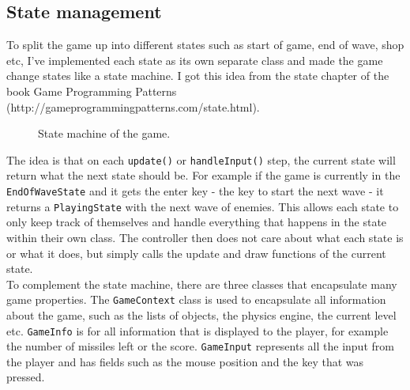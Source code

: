 \documentclass{article}
\newcommand{\n}[0]{\\[\baselineskip]}
\begin{document}
\subsection{State management}
To split the game up into different states such as start of game, end of wave, shop etc, I've implemented each state as its own separate class and made the game change states like a state machine. I got this idea from the state chapter of the book Game Programming Patterns (http://gameprogrammingpatterns.com/state.html).
\begin{figure}[H]
\caption{State machine of the game.}
\end{figure}
\noindent
The idea is that on each \texttt{update()} or \texttt{handleInput()} step, the current state will return what the next state should be. For example if the game is currently in the \texttt{EndOfWaveState} and it gets the enter key - the key to start the next wave - it returns a \texttt{PlayingState} with the next wave of enemies. This allows each state to only keep track of themselves and handle everything that happens in the state within their own class. The controller then does not care about what each state is or what it does, but simply calls the update and draw functions of the current state.
\n
To complement the state machine, there are three classes that encapsulate many game properties. The \texttt{GameContext} class is used to encapsulate all information about the game, such as the lists of objects, the physics engine, the current level etc. \texttt{GameInfo} is for all information that is displayed to the player, for example the number of missiles left or the score. \texttt{GameInput} represents all the input from the player and has fields such as the mouse position and the key that was pressed.
\end{document}
